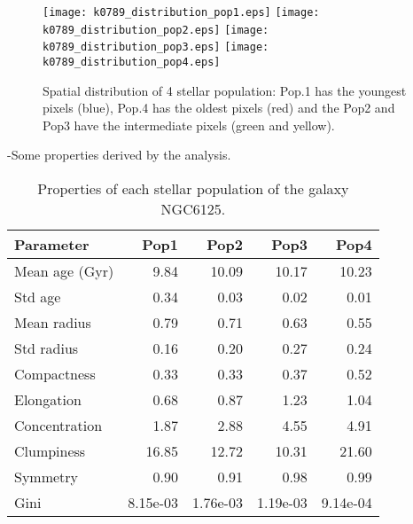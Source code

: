 \begin{figure}[bh]
\begin{center}
\texttt{[image: k0789\_distribution\_pop1.eps]}
\texttt{[image: k0789\_distribution\_pop2.eps]}
\texttt{[image: k0789\_distribution\_pop3.eps]}
\texttt{[image: k0789\_distribution\_pop4.eps]}
 \caption{Spatial distribution of 4 stellar population: Pop.1 has the youngest pixels (blue), Pop.4 has the oldest pixels (red) and the Pop2 and Pop3 have the intermediate pixels (green and yellow).}
   \label{fig1}
\end{center}
\end{figure}

-Some properties derived by the analysis.

\begin{table}[h]
\centering
\begin{tabular}{l|r|r|r|r}
Parameter & Pop1 & Pop2 & Pop3 & Pop4 \\\hline
Mean age (Gyr) & 9.84 & 10.09 & 10.17 & 10.23 \\
Std age & 0.34 & 0.03 & 0.02 & 0.01 \\
Mean radius & 0.79 & 0.71 & 0.63 & 0.55 \\
Std radius & 0.16 & 0.20 & 0.27 & 0.24 \\
Compactness & 0.33 & 0.33 & 0.37 & 0.52 \\
Elongation & 0.68  & 0.87 & 1.23 & 1.04 \\
Concentration & 1.87  & 2.88 & 4.55 & 4.91 \\
Clumpiness & 16.85 & 12.72 & 10.31 & 21.60 \\
Symmetry & 0.90  & 0.91 & 0.98 & 0.99 \\
Gini & 8.15e-03 & 1.76e-03 & 1.19e-03 & 9.14e-04 \\
\end{tabular}
\caption{\label{tab:widgets}Properties of each stellar population of the galaxy NGC6125.}
\end{table}


